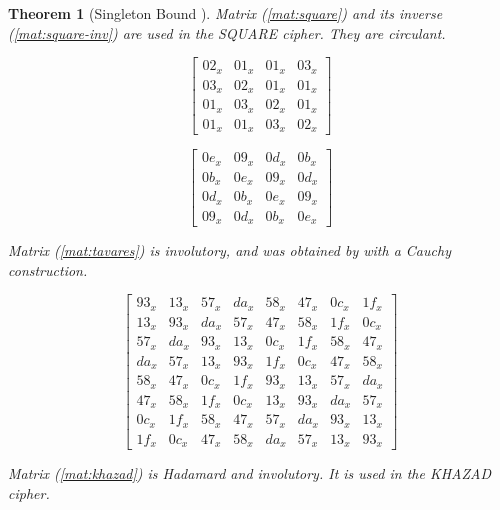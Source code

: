 \documentclass{report}
\newtheorem{theorem}{Theorem}{\bfseries}{\itshape}
\begin{document}
\begin{theorem}[Singleton Bound \cite{SloaneBook}]
Matrix (\ref{mat:square}) and its inverse (\ref{mat:square-inv}) are used in the SQUARE \cite{SQUARE1997} cipher. They are circulant.

\begin{equation}\label{mat:square}
\begin{bmatrix}
02_x & 01_x & 01_x & 03_x\\ 
03_x & 02_x & 01_x & 01_x\\
01_x & 03_x & 02_x & 01_x\\
01_x & 01_x & 03_x & 02_x
\end{bmatrix}
\end{equation}

\begin{equation}\label{mat:square-inv}
\begin{bmatrix}
0e_x & 09_x & 0d_x & 0b_x\\
0b_x & 0e_x & 09_x & 0d_x\\
0d_x & 0b_x & 0e_x & 09_x\\
09_x & 0d_x & 0b_x & 0e_x
\end{bmatrix}
\end{equation}

Matrix (\ref{mat:tavares}) is involutory, and was obtained by \cite{Youssef1997} with a Cauchy construction.

\begin{equation}\label{mat:tavares}
\begin{bmatrix}
93_x & 13_x & 57_x & da_x & 58_x & 47_x & 0c_x & 1f_x\\
13_x & 93_x & da_x & 57_x & 47_x & 58_x & 1f_x & 0c_x\\
57_x & da_x & 93_x & 13_x & 0c_x & 1f_x & 58_x & 47_x\\
da_x & 57_x & 13_x & 93_x & 1f_x & 0c_x & 47_x & 58_x\\
58_x & 47_x & 0c_x & 1f_x & 93_x & 13_x & 57_x & da_x\\
47_x & 58_x & 1f_x & 0c_x & 13_x & 93_x & da_x & 57_x\\
0c_x & 1f_x & 58_x & 47_x & 57_x & da_x & 93_x & 13_x\\
1f_x & 0c_x & 47_x & 58_x & da_x & 57_x & 13_x & 93_x
\end{bmatrix}
\end{equation}

Matrix (\ref{mat:khazad}) is Hadamard and involutory. It is used in the KHAZAD \cite{KHAZAD2000} cipher.


\end{theorem}
\end{document}
